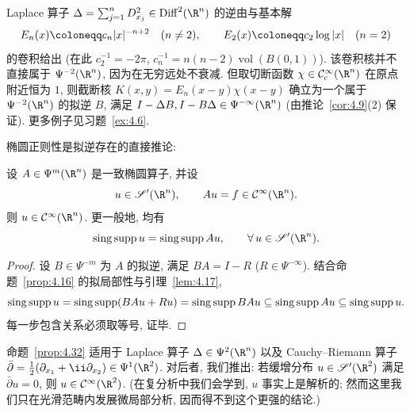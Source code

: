 \begin{example}[Laplace 算子]\label{eg:4.31}
Laplace 算子 $\Delta = \sum_{j=1}^n D_{x_j}^2 \in \Diff^2(\R^n)$ 的逆由与基本解
\begin{equation}\label{eq:4.106}
    E_n(x) \defeq c_n |x|^{-n+2} \quad (n \neq 2), \qquad E_2(x) \defeq c_2 \log |x| \quad (n = 2)
\end{equation}
的卷积给出 (在此 $c_2^{-1} = -2\pi$, $c_n^{-1} = n(n-2) \operatorname{vol}(B(0, 1))$). 该卷积核并不直接属于 $\Psi^{-2}(\R^n)$, 因为在无穷远处不衰减. 但取切断函数 $\chi \in \SmoothComp(\R^n)$ 在原点附近恒为 $1$, 则截断核 $K(x, y) = E_n(x - y) \chi(x - y)$ 确立为一个属于 $\Psi^{-2}(\R^n)$ 的拟逆 $B$, 满足 $I - \Delta B, I - B \Delta \in \Psi^{-\infty}(\R^n)$ (由推论~\ref{cor:4.9}(2) 保证). 更多例子见习题~\ref{ex:4.6}.
\end{example}

椭圆正则性是拟逆存在的直接推论:

\begin{proposition}\label{prop:4.32}
设 $A \in \Psi^m(\R^n)$ 是一致椭圆算子, 并设
\begin{equation}\label{eq:4.107}
    u \in \TempDistr(\R^n), \qquad A u = f \in \Smooth(\R^n).
\end{equation}
则 $u \in \Smooth(\R^n)$. 更一般地, 均有
\begin{equation}\label{eq:4.108}
    \singsupp u = \singsupp A u, \qquad \forall\,u \in \TempDistr(\R^n).
\end{equation}
\end{proposition}

\begin{proof}
设 $B \in \Psi^{-m}$ 为 $A$ 的拟逆, 满足 $B A = I - R$ ($R \in \Psi^{-\infty}$). 结合命题~\ref{prop:4.16} 的拟局部性与引理~\ref{lem:4.17},
\begin{equation}\label{eq:4.109}
    \operatorname{sing\,supp} u = \operatorname{sing\,supp}(B A u + R u) = \operatorname{sing\,supp} B A u \subseteq \operatorname{sing\,supp} A u \subseteq \operatorname{sing\,supp} u.
\end{equation}
每一步包含关系必须取等号, 证毕.
\end{proof}

\begin{example}[椭圆算子]\label{eg:4.33}
命题~\ref{prop:4.32} 适用于 Laplace 算子 $\Delta \in \Psi^2(\R^n)$ 以及 Cauchy--Riemann 算子 $\bar{\partial} = \frac{1}{2}(\partial_{x_1} + \ii \partial_{x_2}) \in \Psi^1(\R^2)$. 对后者, 我们推出: 若缓增分布 $u \in \TempDistr(\R^2)$ 满足 $\bar{\partial} u = 0$, 则 $u \in \Smooth(\R^2)$. (在复分析中我们会学到, $u$ 事实上是解析的; 然而这里我们只在光滑范畴内发展微局部分析, 因而得不到这个更强的结论.)
\end{example}

